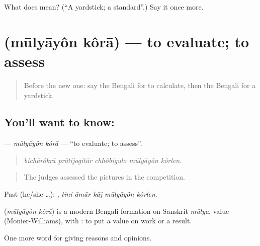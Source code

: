 \begin{tcolorbox}[breakable,colback=teal!4,colframe=teal!35!black,title={Before you move on}]
What does  mean? (\textquotedblleft{}A yardstick; a standard\textquotedblright{}.) Say it once more.
\end{tcolorbox}
\section[\texorpdfstring{\bn{মূল্যায়ন} \bn{করা} (mūlyāyôn kôrā)}{মূল্যায়ন করা (mūlyāyôn kôrā)}]{  (mūlyāyôn kôrā) — to evaluate; to assess}

\label{lesson:BN-C356-mulyayon-kora}



\begin{quote}
Before the new one: say the Bengali for to calculate, then the Bengali for a yardstick.
\end{quote}

\subsection*{You'll want to know:  }
\textbf{ } — \emph{mūlyāyôn kôrā} — \textquotedblleft{}to evaluate; to assess\textquotedblright{}.

\begin{quote}
    
\end{quote}

\begin{quote}
\emph{bichārôkrā prôtijogitār chhôbigulo mūlyāyôn kôrlen.}
\end{quote}

\begin{quote}
The judges assessed the pictures in the competition.
\end{quote}

Past (he/she …):     , \emph{tini āmār kāj mūlyāyôn kôrlen}.

\begin{cousinweb}
\textbf{ } (\emph{mūlyāyôn kôrā}) is a modern Bengali formation on Sanskrit \emph{mūlya}, value (Monier-Williams), with : to put a value on work or a result.
\end{cousinweb}

\begin{grammarlens}[title={What you've built}]
One more word for giving reasons and opinions.
\end{grammarlens}

